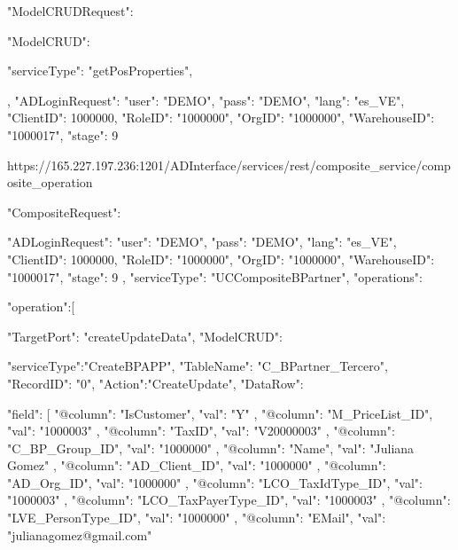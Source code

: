 {
    "ModelCRUDRequest": {
        "ModelCRUD": {
            "serviceType": "getPosProperties",
           
        },
        "ADLoginRequest": {
            "user": "DEMO",
            "pass": "DEMO",
            "lang": "es_VE",
            "ClientID": 1000000,
            "RoleID": "1000000",
            "OrgID": "1000000",
            "WarehouseID": "1000017",
            "stage": 9
        }
    }
}




https://165.227.197.236:1201/ADInterface/services/rest/composite_service/composite_operation

{

    "CompositeRequest":{
        
         "ADLoginRequest": {
        "user": "DEMO",
        "pass": "DEMO",
        "lang": "es_VE",
        "ClientID": 1000000,
        "RoleID": "1000000",
        "OrgID": "1000000",
        "WarehouseID": "1000017",
        "stage": 9
      },
    "serviceType": "UCCompositeBPartner",
        "operations":{
            "operation":[
                {
                "TargetPort": "createUpdateData",
                "ModelCRUD": {
                    "serviceType":"CreateBPAPP",
                    "TableName": "C_BPartner_Tercero",
                    "RecordID": "0",
                    "Action":"CreateUpdate",
                    "DataRow": {
                "field": [
                    {
                        "@column": "IsCustomer",
                        "val": "Y"
                    },
                    {
                        "@column": "M_PriceList_ID",
                        "val": "1000003"
                    },
                    {
                        "@column": "TaxID",
                        "val": "V20000003"
                    },
                    {
                        "@column": "C_BP_Group_ID",
                        "val": "1000000"
                    },
                    {
                        "@column": "Name",
                        "val": "Juliana Gomez"
                    },
                    {
                        "@column": "AD_Client_ID",
                        "val": "1000000"
                    },
                    {
                        "@column": "AD_Org_ID",
                        "val": "1000000"
                    },
                    {
                        "@column": "LCO_TaxIdType_ID",
                        "val": "1000003"
                    },
                    {
                        "@column": "LCO_TaxPayerType_ID",
                        "val": "1000003"
                    },
                    {
                        "@column": "LVE_PersonType_ID",
                        "val": "1000000"
                    },
                    {
                        "@column": "EMail",
                        "val": "julianagomez@gmail.com"
                    }
             
}}}}}}
